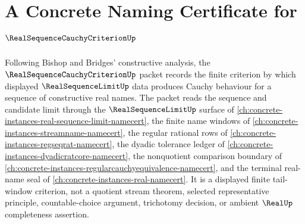 \chapter{A Concrete Naming Certificate for $\RealSequenceCauchyCriterionUp$}
\label{ch:concrete-instances-real-sequence-cauchy-criterion-namecert}

Following Bishop and Bridges' constructive analysis, the $\RealSequenceCauchyCriterionUp$ packet records the finite criterion by which displayed $\RealSequenceLimitUp$ data produces Cauchy behaviour for a sequence of constructive real names. The packet reads the sequence and candidate limit through the $\RealSequenceLimitUp$ surface of \autoref{ch:concrete-instances-real-sequence-limit-namecert}, the finite name windows of \autoref{ch:concrete-instances-streamname-namecert}, the regular rational rows of \autoref{ch:concrete-instances-regseqrat-namecert}, the dyadic tolerance ledger of \autoref{ch:concrete-instances-dyadicratcore-namecert}, the nonquotient comparison boundary of \autoref{ch:concrete-instances-regularcauchyequivalence-namecert}, and the terminal real-name seal of \autoref{ch:concrete-instances-real-namecert}. It is a displayed finite tail-window criterion, not a quotient stream theorem, selected representative principle, countable-choice argument, trichotomy decision, or ambient $\RealUp$ completeness assertion.

